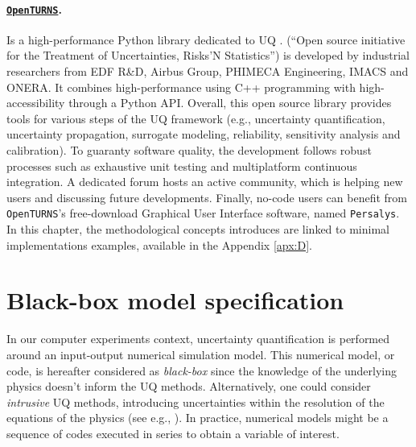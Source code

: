 \paragraph*{\href{https://openturns.github.io/www/}{\textbf{\texttt{OpenTURNS}}}\footnotemark.} 
Is a high-performance Python library dedicated to UQ \citep{baudin_dutfoy_2017}. 
\ot (``Open source initiative for the Treatment of Uncertainties, Risks’N Statistics'') is developed by industrial researchers from  EDF R\&D, Airbus Group, PHIMECA Engineering, IMACS and ONERA. 
It combines high-performance using C++ programming with high-accessibility through a Python API. 
Overall, this open source library provides tools for various steps of the UQ framework (e.g., uncertainty quantification, uncertainty propagation, surrogate modeling, reliability, sensitivity analysis and calibration). 
To guaranty software quality, the development follows robust processes such as exhaustive unit testing and multiplatform continuous integration. 
A dedicated forum hosts an active community, which is helping new users and discussing future developments. 
Finally, no-code users can benefit from \texttt{OpenTURNS}'s free-download Graphical User Interface software, named \texttt{Persalys}\footnotemark. 
In this chapter, the methodological concepts introduces are linked to minimal \ot implementations examples, available in the Appendix \ref{apx:D}. 


\section{Black-box model specification} \label{sec:model_spec}
In our computer experiments context, uncertainty quantification is performed around an input-output numerical simulation model. 
This numerical model, or code, is hereafter considered as \textit{black-box} since the knowledge of the underlying physics doesn't inform the UQ methods. 
Alternatively, one could consider \textit{intrusive} UQ methods, introducing uncertainties within the resolution of the equations of the physics (see e.g., \citealt{lemaitre_2010}). 
In practice, numerical models might be a sequence of codes executed in series to obtain a variable of interest.

